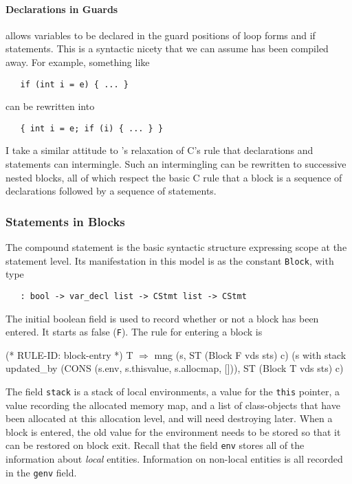 \documentclass[11pt]{article}
\begin{document}
\paragraph{Declarations in Guards}
\cpp{} allows variables to be declared in the guard positions of loop
forms and if statements.  This is a syntactic nicety that we can assume
has been compiled away.  For example, something like
\begin{verbatim}
   if (int i = e) { ... }
\end{verbatim}
can be rewritten into
\begin{verbatim}
   { int i = e; if (i) { ... } }
\end{verbatim}
I take a similar attitude to \cpp's relaxation of C's rule that
declarations and statements can intermingle.  Such an intermingling
can be rewritten to successive nested blocks, all of which respect the
basic C rule that a block is a sequence of declarations followed by a
sequence of statements.

\subsubsection{Statements in Blocks}
\label{sec:statements-blocks}

The compound statement is the basic syntactic structure expressing
scope at the statement level.  Its manifestation in this model is as
the constant \texttt{Block}, with type
\begin{verbatim}
   : bool -> var_decl list -> CStmt list -> CStmt
\end{verbatim}
The initial boolean field is used to record whether or not a block has
been entered.  It starts as false (\texttt{F}).  The rule for entering
a block is%
%
\begin{stdrule}
(* RULE-ID: block-entry *)
     T
   \(\Rightarrow\)
     mng (s, ST (Block F vds sts) c)
         (s with stack updated_by
                       (CONS (s.env, s.thisvalue, s.allocmap, [])),
          ST (Block T vds sts) c)
\end{stdrule}
%
%
The field \texttt{stack} is a stack of local environments, a value for
the \texttt{this} pointer, a value recording the allocated memory map,
and a list of class-objects that have been allocated at this
allocation level, and will need destroying later.  When a block is
entered, the old value for the environment needs to be stored so that
it can be restored on block exit.  Recall that the field \texttt{env}
stores all of the information about \emph{local} entities.
Information on non-local entities is all recorded in the \texttt{genv}
field.
\end{document}
